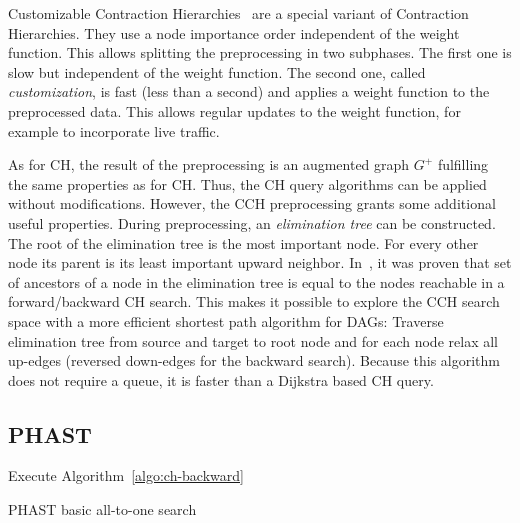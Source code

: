 \documentclass[manuscript,review]{acmart}
\begin{document}
Customizable Contraction Hierarchies~\cite{dsw-cch-15} are a special variant of Contraction Hierarchies.
They use a node importance order independent of the weight function.
This allows splitting the preprocessing in two subphases.
The first one is slow but independent of the weight function.
The second one, called \emph{customization}, is fast (less than a second) and applies a weight function to the preprocessed data.
This allows regular updates to the weight function, for example to incorporate live traffic.

As for CH, the result of the preprocessing is an augmented graph $G^+$ fulfilling the same properties as for CH.
Thus, the CH query algorithms can be applied without modifications.
However, the CCH preprocessing grants some additional useful properties.
During preprocessing, an \emph{elimination tree} can be constructed.
The root of the elimination tree is the most important node.
For every other node its parent is its least important upward neighbor.
In~\cite{bcrw-s-16}, it was proven that set of ancestors of a node in the elimination tree is equal to the nodes reachable in a forward/backward CH search.
This makes it possible to explore the CCH search space with a more efficient shortest path algorithm for DAGs:
Traverse elimination tree from source and target to root node and for each node relax all up-edges (reversed down-edges for the backward search).
Because this algorithm does not require a queue, it is faster than a Dijkstra based CH query.

\subsection{PHAST}

\begin{algorithm2e}
Execute Algorithm~\ref{algo:ch-backward}\;
\caption{PHAST basic all-to-one search}
\label{algo:phast}
\end{algorithm2e}
\end{document}
